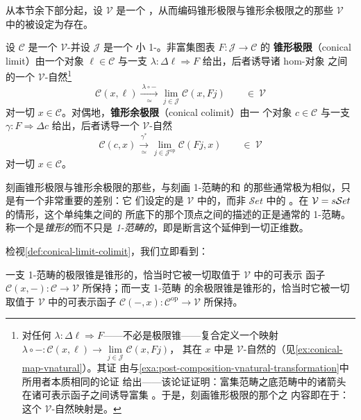 从本节余下部分起，设 $\mathcal{V}$ 是一个\trComplete{}\trCartesianClosed{}%
\trCategory，从而编码锥形极限与锥形余极限之\trUniversalProperty{}的那些
$\mathcal{V}$ 中的\trLimit{}被设定为存在。

\begin{definition}\label{def:conical-limit-colimit}
设 $\mathcal{C}$ 是一个 $\mathcal{V}$-\trCategory{}并设 $\mathcal{J}$ 是一个
小 1-\trCategory。非富集图表 $F\colon\mathcal{J}\to\mathcal{C}$ 的%
\textbf{锥形极限}（conical limit）由一个对象 $\ell\in\mathcal{C}$ 与一支%
\trCone{} $\lambda\colon\Delta\ell\Rightarrow F$ 给出，后者诱导诸 hom-对象
之间的一个 $\mathcal{V}$-自然\footnote{对任何\trCone{}
$\lambda\colon\Delta\ell\Rightarrow F$——不必是极限锥——复合定义一个映射
$\lambda\circ-\colon\mathcal{C}(x,\ell)\to\lim\limits_{j\in\mathcal{J}}\mathcal{C}(x,Fj)$，
其在 $x$ 中是 $\mathcal{V}$-自然的（见\cref{ex:conical-map-vnatural}）。其证
由与\cref{exa:post-composition-vnatural-transformation}中所用者本质相同的论证
给出——该论证证明：富集范畴之底范畴中的诸箭头在诸可表示函子之间诱导富集%
\trNaturalTransformation。于是，刻画锥形极限的那个\trUniversalProperty{}之
内容即在于：这个 $\mathcal{V}$-自然映射是\trInvertible。}\trIsomorphism
\[ \mathcal{C}(x,\ell)\xrightarrow[\ \simeq\ ]{\ \lambda\circ-\ }
   \lim_{j\in\mathcal{J}}\mathcal{C}(x,Fj)
   \qquad\in\ \mathcal{V} \]
对一切 $x\in\mathcal{C}$。对偶地，\textbf{锥形余极限}（conical colimit）由一
个对象 $c\in\mathcal{C}$ 与一支\trCone{} $\gamma\colon F\Rightarrow\Delta c$
给出，后者诱导一个 $\mathcal{V}$-自然\trIsomorphism
\[ \mathcal{C}(c,x)\xrightarrow[\ \simeq\ ]{\ \gamma^{*}\ }
   \lim_{j\in\mathcal{J}^{\mathrm{op}}}\mathcal{C}(Fj,x)
   \qquad\in\ \mathcal{V} \]
对一切 $x\in\mathcal{C}$。
\end{definition}

刻画锥形极限与锥形余极限的那些\trIsomorphism，与刻画 1-范畴的\trLimit{}和%
\trColimit{}的那些通常\trIsomorphism{}极为相似，只是有一个非常重要的差别：它
们设定的是 $\mathcal{V}$ 中的\trIsomorphism，而非 $\mathcal{S}et$ 中的%
\trIsomorphism。在 $\mathcal{V}=s\mathcal{S}et$ 的情形，这个单纯集之间的%
\trIsomorphism{}所底下的那个顶点之间的\trIsomorphism{}描述的正是通常的
1-范畴\trUniversalProperty。称一个\trLimit{}是\emph{锥形的}而不只是%
\emph{1-范畴的}，即是断言这个\trUniversalProperty{}延伸到一切正维数。

检视\cref{def:conical-limit-colimit}，我们立即看到：

\begin{proposition}\label{prop:conical-representables}
一支 1-范畴的极限锥是锥形的，恰当时它被一切取值于 $\mathcal{V}$ 中的可表示
函子 $\mathcal{C}(x,-)\colon\mathcal{C}\to\mathcal{V}$ 所保持；而一支 1-范畴
的余极限锥是锥形的，恰当时它被一切取值于 $\mathcal{V}$ 中的可表示函子
$\mathcal{C}(-,x)\colon\mathcal{C}^{\mathrm{op}}\to\mathcal{V}$ 所保持。
\end{proposition}

